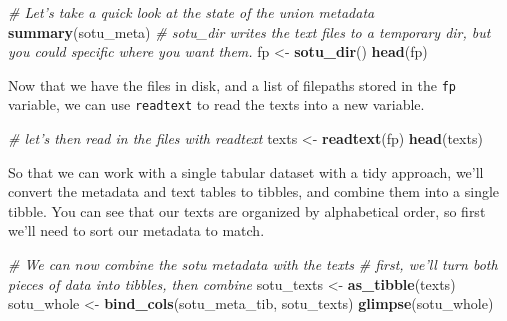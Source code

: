 \documentclass[]{book}
\newenvironment{Shaded}{\begin{snugshade}}{\end{snugshade}}
\newcommand{\CommentTok}[1]{\textcolor[rgb]{0.56,0.35,0.01}{\textit{#1}}}
\newcommand{\KeywordTok}[1]{\textcolor[rgb]{0.13,0.29,0.53}{\textbf{#1}}}
\newcommand{\NormalTok}[1]{#1}
\newcommand{\OperatorTok}[1]{\textcolor[rgb]{0.81,0.36,0.00}{\textbf{#1}}}
\newcommand{\StringTok}[1]{\textcolor[rgb]{0.31,0.60,0.02}{#1}}
\begin{document}
\begin{Shaded}
\begin{Highlighting}[]
\CommentTok{# Let's take a quick look at the state of the union metadata}
\KeywordTok{summary}\NormalTok{(sotu_meta)}
\CommentTok{# sotu_dir writes the text files to a temporary dir, but you could specific where you want them.}
\NormalTok{fp <-}\StringTok{ }\KeywordTok{sotu_dir}\NormalTok{()}
\KeywordTok{head}\NormalTok{(fp)}
\end{Highlighting}
\end{Shaded}

Now that we have the files in disk, and a list of filepaths stored in the \texttt{fp} variable, we can use \texttt{readtext} to read the texts into a new variable.

\begin{Shaded}
\begin{Highlighting}[]
\CommentTok{# let's then read in the files with readtext}
\NormalTok{texts <-}\StringTok{ }\KeywordTok{readtext}\NormalTok{(fp)}
\KeywordTok{head}\NormalTok{(texts)}
\end{Highlighting}
\end{Shaded}

So that we can work with a single tabular dataset with a tidy approach, we'll convert the metadata and text tables to tibbles, and combine them into a single tibble. You can see that our texts are organized by alphabetical order, so first we'll need to sort our metadata to match.

\begin{Shaded}
\end{Shaded}

\begin{Shaded}
\begin{Highlighting}[]
\CommentTok{# We can now combine the sotu metadata with the texts}
\CommentTok{# first, we'll turn both pieces of data into tibbles, then combine}
\NormalTok{sotu_texts <-}\StringTok{ }\KeywordTok{as_tibble}\NormalTok{(texts)}
\NormalTok{sotu_whole <-}\StringTok{ }\KeywordTok{bind_cols}\NormalTok{(sotu_meta_tib, sotu_texts)}
\KeywordTok{glimpse}\NormalTok{(sotu_whole)}
\end{Highlighting}
\end{Shaded}
\end{document}
